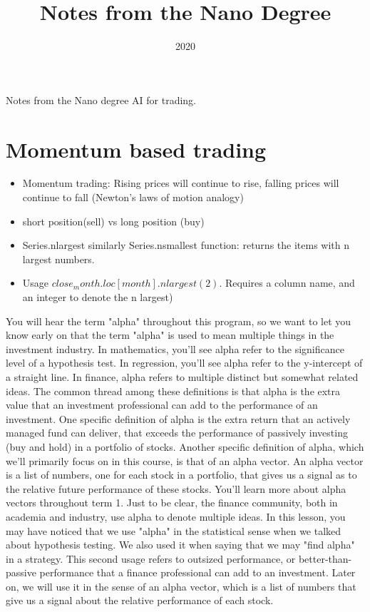 \documentclass[a4paper]{tufte-handout}
\title{Notes from the Nano Degree}
\date{2020}
\begin{document}
\maketitle


\begin{projects}
    \begin{description}
        \item Notes from the Nano degree AI for trading.
    \end{description}
\end{projects}

\section{Momentum based trading}
\begin{itemize}
    \item Momentum trading: Rising prices will continue to rise, falling prices will continue to fall (Newton's laws of motion analogy)
    \item short position(sell) vs long position (buy)
    \item Series.nlargest similarly Series.nsmallest function: returns the items with n largest numbers.
    \item Usage $ close_month.loc[month].nlargest(2) $. Requires a column name, and an integer to denote the n largest)
\end{itemize}

You will hear the term "alpha" throughout this program, so we want to let you know early on that the term "alpha"
is used to mean multiple things in the investment industry.
In mathematics, you'll see alpha refer to the significance level of a hypothesis test. In regression, you'll
see alpha refer to the y-intercept of a straight line.
In finance, alpha refers to multiple distinct but somewhat related ideas. The common thread among these definitions
is that alpha is the extra value that an investment professional can add to the performance of an investment.
One specific definition of alpha is the extra return that an actively managed fund can deliver, that exceeds
the performance of passively investing (buy and hold) in a portfolio of stocks. Another specific definition of alpha,
which we'll primarily focus on in this course, is that of an alpha vector.
An alpha vector is a list of numbers, one for each stock in a portfolio,
that gives us a signal as to the relative future performance of these stocks. You'll learn more about alpha vectors throughout term 1.
Just to be clear, the finance community, both in academia and industry, use alpha to denote multiple ideas.
In this lesson, you may have noticed that we use "alpha" in the statistical sense when we talked about hypothesis testing.
We also used it when saying that we may "find alpha" in a strategy.
This second usage refers to outsized performance, or better-than-passive performance that a finance professional
can add to an investment. Later on, we will use it in the sense of an alpha vector,
which is a list of numbers that give us a signal about the relative performance of each stock.
\end{document}
